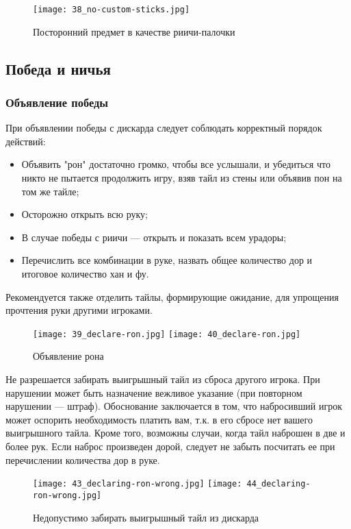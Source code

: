 \begin{figure}[H]
	\centering
	\texttt{[image: 38\_no-custom-sticks.jpg]}
	\caption{Посторонний предмет в качестве риичи-палочки}
\end{figure}

\subsection{Победа и ничья}

\subsubsection{Объявление победы}

При объявлении победы с дискарда следует соблюдать корректный порядок действий:

\begin{itemize}
	\item Объявить "рон" достаточно громко, чтобы все услышали, и убедиться что никто не пытается продолжить игру, взяв тайл из стены или объявив пон на том же тайле;
	\item Осторожно открыть всю руку;
	\item В случае победы с риичи --- открыть и показать всем урадоры;
	\item Перечислить все комбинации в руке, назвать общее количество дор и итоговое количество хан и фу.
\end{itemize}

Рекомендуется также отделить тайлы, формирующие ожидание, для упрощения прочтения руки другими игроками.

\begin{figure}[H]
	\centering
	\texttt{[image: 39\_declare-ron.jpg]}
	\texttt{[image: 40\_declare-ron.jpg]}
	\caption{Объявление рона}
\end{figure}

Не разрешается забирать выигрышный тайл из сброса другого игрока. При нарушении может быть назначение вежливое указание (при повторном нарушении --- штраф). Обоснование заключается в том, что набросивший игрок может оспорить необходимость платить вам, т.к. в его сбросе нет вашего выигрышного тайла. Кроме того, возможны случаи, когда тайл наброшен в две и более рук. Если наброс произведен дорой, следует не забыть посчитать ее при перечислении количества дор в руке.

\begin{figure}[H]
	\centering
	\texttt{[image: 43\_declaring-ron-wrong.jpg]}
	\texttt{[image: 44\_declaring-ron-wrong.jpg]}
	\caption{Недопустимо забирать выигрышный тайл из дискарда}
\end{figure}

